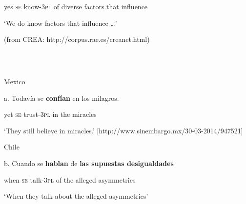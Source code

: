 \documentclass[output=paper]{langsci/langscibook}
\begin{document}
\begin{styleBodyTextIndentii}
       yes \textsc{se}   know{}-\textsc{3pl}  of  diverse   factors    that influence
\end{styleBodyTextIndentii}

\begin{styleBodyTextIndentii}
       ‘We do know factors that influence …’
\end{styleBodyTextIndentii}

\begin{styleBodyTextIndentii}
(from CREA: http://corpus.rae.es/creanet.html)
\end{styleBodyTextIndentii}

\begin{styleBodyTextIndentii}
\ea%
    \label{ex:key:29}
    \gll\\
        \\
    \glt
    \z

           Mexico
\end{styleBodyTextIndentii}

\begin{styleBodyTextIndentii}
a.   Todavía se   \textbf{confían}    en  los   milagros.   
\end{styleBodyTextIndentii}

\begin{styleBodyTextIndentii}
        yet         \textsc{se}   trust{}-\textsc{3pl}  in  the   miracles
\end{styleBodyTextIndentii}

\begin{styleBodyTextIndentii}
‘They still believe in miracles.’ [http://www.sinembargo.mx/30-03-2014/947521]
\end{styleBodyTextIndentii}

\begin{styleBodyTextIndentii}
  Chile
\end{styleBodyTextIndentii}

\begin{styleBodyTextIndentii}
b.   Cuando se   \textbf{hablan}    de  \textbf{las supuestas desigualdades}  
\end{styleBodyTextIndentii}

\begin{styleBodyTextIndentii}
                 when     \textsc{se}   talk{}-\textsc{3pl}   of  the alleged      asymmetries
\end{styleBodyTextIndentii}

\begin{styleBodyTextIndentii}
       ‘When they talk about the alleged asymmetries’
\end{styleBodyTextIndentii}
\end{document}
